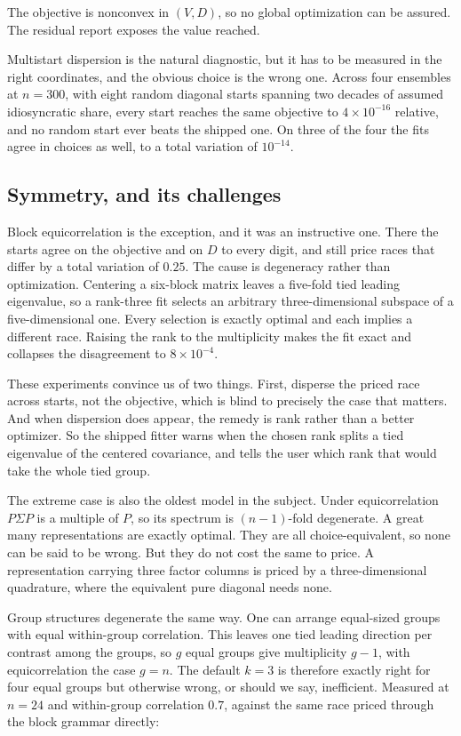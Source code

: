 \documentclass[11pt]{article}
\begin{document}
The objective is nonconvex in $(V,D)$, so
no global optimization can be assured. The residual report exposes the
value reached.

Multistart dispersion is the natural diagnostic, but it
has to be measured in the right coordinates, and the obvious choice is
the wrong one. Across four ensembles at $n=300$, with eight random diagonal starts
spanning two decades of assumed idiosyncratic share, every start reaches
the same objective to $4\times10^{-16}$ relative, and no random start
ever beats the shipped one. On three of the four the fits agree in
choices as well, to a total variation of $10^{-14}$.

\subsection{Symmetry, and its challenges}

Block equicorrelation is the exception, and it was an instructive one. There the
starts agree on the objective and on $D$ to every digit, and still price
races that differ by a total variation of $0.25$. The cause is degeneracy
rather than optimization. Centering a six-block matrix leaves a five-fold
tied leading eigenvalue, so a rank-three fit selects an arbitrary
three-dimensional subspace of a five-dimensional one. Every selection is
exactly optimal and each implies a different race. Raising the rank to
the multiplicity makes the fit exact and collapses the disagreement to
$8\times10^{-4}$.

These experiments convince us of two things. First, disperse the priced race across starts, not the objective, which is blind to precisely the case that matters. And when
dispersion does appear, the remedy is rank rather than a better
optimizer. So the shipped fitter warns when the chosen rank splits a tied
eigenvalue of the centered covariance, and tells the user which rank that would take
the whole tied group.

The extreme case is also the oldest model in the subject. Under equicorrelation $P\Sigma P$ is a multiple of $P$, so its
spectrum is $(n-1)$-fold degenerate. A great many representations are
exactly optimal. They are all
choice-equivalent, so none can be said to be wrong. But they do not cost the same to
price. A representation carrying three factor columns is priced by a
three-dimensional quadrature, where the equivalent pure diagonal needs
none.

Group structures degenerate the same way. One can arrange equal-sized groups with equal within-group correlation. This leaves one tied leading direction per contrast among the groups, so $g$ equal
groups give multiplicity $g-1$, with equicorrelation the case $g=n$. The
default $k=3$ is therefore exactly right for four equal groups but otherwise wrong, or should we say, inefficient. Measured at $n=24$ and within-group correlation
$0.7$, against the same race priced through the block grammar directly:
\end{document}
